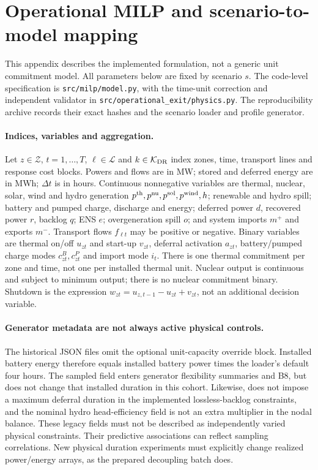 \section{Operational MILP and scenario-to-model mapping}
\label{app:milp}
This appendix describes the implemented formulation, not a generic unit
commitment model. All parameters below are fixed by scenario $s$.
The code-level specification is \texttt{src/milp/model.py}, with the
time-unit correction and independent validator in
\texttt{src/operational\_exit/physics.py}. The reproducibility archive
records their exact hashes and the scenario loader and profile generator.

\paragraph{Indices, variables and aggregation.}
Let $z\in\mathcal Z$, $t=1,\ldots,T$, $\ell\in\mathcal L$ and
$k\in\mathcal K_{\rm DR}$ index zones, time, transport lines and response
cost blocks. Powers and flows are in MW; stored and deferred energy are in
MWh; $\Delta t$ is in hours. Continuous nonnegative variables are thermal,
nuclear, solar, wind and hydro generation $p^{\rm th},p^{\rm nu},p^{\rm sol},
p^{\rm wind},h$; renewable and hydro spill; battery and pumped charge,
discharge and energy; deferred power $d$, recovered power $r$, backlog $q$;
ENS $e$; overgeneration spill $o$; and system imports $m^+$ and exports $m^-$.
Transport flows $f_{\ell t}$ may be positive or negative. Binary variables
are thermal on/off $u_{zt}$ and start-up $v_{zt}$, deferral activation $a_{zt}$,
battery/pumped charge modes $c^B_{zt},c^P_{zt}$ and import mode $i_t$.
There is one thermal commitment per zone and time, not one per installed
thermal unit. Nuclear output is continuous and subject to minimum output;
there is no nuclear commitment binary. Shutdown is the expression
$w_{zt}=u_{z,t-1}-u_{zt}+v_{zt}$, not an additional decision variable.

\paragraph{Generator metadata are not always active physical controls.}
The historical JSON files omit the optional unit-capacity override block.
Installed battery energy therefore equals installed battery power times the
loader's default four hours. The sampled field
 enters generator flexibility summaries and B8,
but does not change that installed duration in this cohort. Likewise,
 does not impose a maximum deferral duration in the
implemented lossless-backlog constraints, and the nominal hydro head-efficiency
field is not an extra multiplier in the nodal balance. These legacy fields
must not be described as independently varied physical constraints. Their
predictive associations can reflect sampling correlations. New physical
duration experiments must explicitly change realized power/energy arrays,
as the prepared decoupling batch does.

